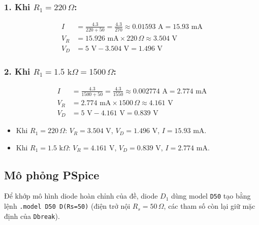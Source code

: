\subsubsection*{1. Khi $R_1 = 220\,\Omega$:}
\begin{align*}
  I &= \frac{4.3}{220 + 50} = \frac{4.3}{270} \approx 0.01593\text{ A} = 15.93\text{ mA} \\
  V_R &= 15.926\text{ mA} \times 220\,\Omega \approx 3.504\text{ V} \\
  V_D &= 5\text{ V} - 3.504\text{ V} = 1.496\text{ V}
\end{align*}

\subsubsection*{2. Khi $R_1 = 1.5\text{ k}\Omega = 1500\,\Omega$:}
\begin{align*}
  I &= \frac{4.3}{1500 + 50} = \frac{4.3}{1550} \approx 0.002774\text{ A} = 2.774\text{ mA} \\
  V_R &= 2.774\text{ mA} \times 1500\,\Omega \approx 4.161\text{ V} \\
  V_D &= 5\text{ V} - 4.161\text{ V} = 0.839\text{ V}
\end{align*}

\begin{dapsobox}
  \begin{itemize}[leftmargin=1.5em]
    \item Khi $R_1 = 220\,\Omega$: $V_R = 3.504\text{ V}$, $V_D = 1.496\text{ V}$, $I = 15.93\text{ mA}$.
    \item Khi $R_1 = 1.5\text{ k}\Omega$: $V_R = 4.161\text{ V}$, $V_D = 0.839\text{ V}$, $I = 2.774\text{ mA}$.
  \end{itemize}
\end{dapsobox}

\Needspace{0.66\textheight}
\subsection{Mô phỏng PSpice}
\noindent Để khớp mô hình diode hoàn chỉnh của đề, diode $D_1$ dùng model \texttt{D50} tạo bằng lệnh \texttt{.model D50 D(Rs=50)} (điện trở nội $R_s = 50\,\Omega$, các tham số còn lại giữ mặc định của \texttt{Dbreak}).
\simresult
{}

